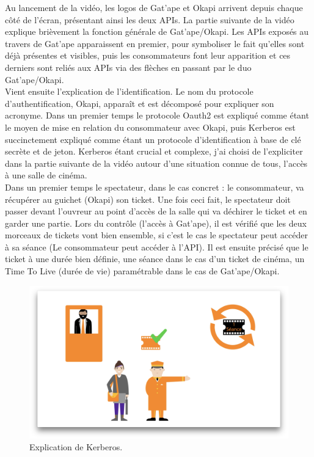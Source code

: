 Au lancement de la vidéo, les logos de Gat'ape et Okapi arrivent depuis chaque côté de l'écran, présentant ainsi les deux APIs. La partie suivante de la vidéo explique brièvement la fonction générale de Gat'ape/Okapi. Les APIs exposés au travers de Gat'ape apparaissent en premier, pour symboliser le fait qu'elles sont déjà présentes et visibles, puis les consommateurs font leur apparition et ces derniers sont reliés aux APIs via des flèches en passant par le duo Gat'ape/Okapi.\\

Vient ensuite l'explication de l'identification. Le nom du protocole d'authentification, Okapi, apparaît et est décomposé pour expliquer son acronyme. Dans un premier temps le protocole Oauth2 est expliqué comme étant le moyen de mise en relation du consommateur avec Okapi,  puis Kerberos est succinctement expliqué comme étant un protocole d'identification à base de clé secrète et de jeton. Kerberos étant crucial et complexe, j'ai choisi de l'expliciter dans la partie suivante de la vidéo autour d'une situation connue de tous, l'accès à une salle de cinéma.\\

Dans un premier temps le spectateur, dans le cas concret : le consommateur, va récupérer au guichet (Okapi) son ticket. Une fois ceci fait, le spectateur doit passer devant l'ouvreur au point d'accès de la salle qui va déchirer le ticket et en garder une partie. Lors du contrôle (l'accès à Gat'ape), il est vérifié que les deux morceaux de tickets vont bien ensemble, si c'est le cas le spectateur peut accéder à sa séance (Le consommateur peut accéder à l'API). Il est ensuite précisé que le ticket à une durée bien définie, une séance dans le cas d'un ticket de cinéma, un Time To Live (durée de vie) paramétrable dans le cas de Gat'ape/Okapi.\\

\begin{figure}[htp]
  \centering
  \includegraphics[width=15cm]{images/gao/screenGao}
  \caption{Explication de Kerberos.}
  \label{screengatape}
\end{figure}

